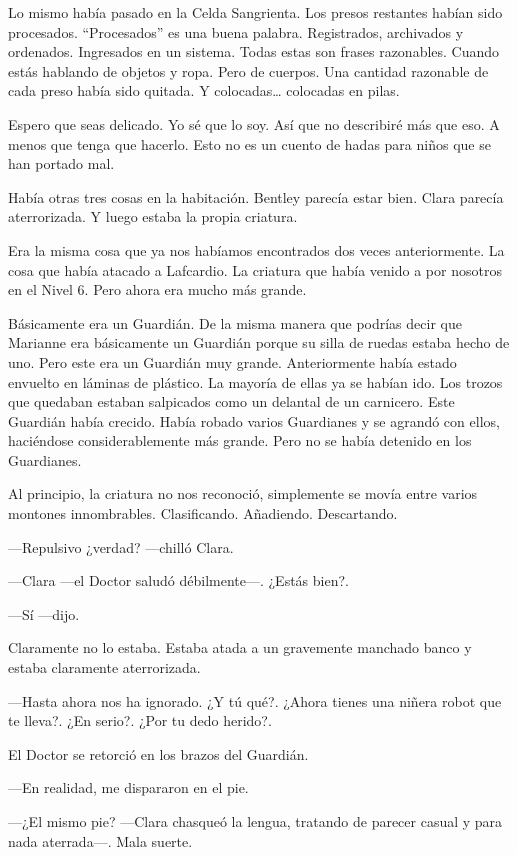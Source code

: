 Lo mismo había pasado en la Celda Sangrienta. Los presos restantes
habían sido procesados. ``Procesados'' es una buena palabra.
Registrados, archivados y ordenados. Ingresados en un sistema. Todas
estas son frases razonables. Cuando estás hablando de objetos y ropa.
Pero de cuerpos. Una cantidad razonable de cada preso había sido
quitada. Y colocadas\ldots{} colocadas en pilas.

Espero que seas delicado. Yo sé que lo soy. Así que no describiré más
que eso. A menos que tenga que hacerlo. Esto no es un cuento de hadas
para niños que se han portado mal.

Había otras tres cosas en la habitación. Bentley parecía estar bien.
Clara parecía aterrorizada. Y luego estaba la propia criatura.

Era la misma cosa que ya nos habíamos encontrados dos veces
anteriormente. La cosa que había atacado a Lafcardio. La criatura que
había venido a por nosotros en el Nivel 6. Pero ahora era mucho más
grande.

Básicamente era un Guardián. De la misma manera que podrías decir que
Marianne era básicamente un Guardián porque su silla de ruedas estaba
hecho de uno. Pero este era un Guardián muy grande. Anteriormente había
estado envuelto en láminas de plástico. La mayoría de ellas ya se habían
ido. Los trozos que quedaban estaban salpicados como un delantal de un
carnicero. Este Guardián había crecido. Había robado varios Guardianes y
se agrandó con ellos, haciéndose considerablemente más grande. Pero no
se había detenido en los Guardianes.

Al principio, la criatura no nos reconoció, simplemente se movía entre
varios montones innombrables. Clasificando. Añadiendo. Descartando.

---Repulsivo ¿verdad? ---chilló Clara.

---Clara ---el Doctor saludó débilmente---. ¿Estás bien?.

---Sí ---dijo.

Claramente no lo estaba. Estaba atada a un gravemente manchado banco y
estaba claramente aterrorizada.

---Hasta ahora nos ha ignorado. ¿Y tú qué?. ¿Ahora tienes una niñera
robot que te lleva?. ¿En serio?. ¿Por tu dedo herido?.

El Doctor se retorció en los brazos del Guardián.

---En realidad, me dispararon en el pie.

---¿El mismo pie? ---Clara chasqueó la lengua, tratando de parecer
casual y para nada aterrada---. Mala suerte.

